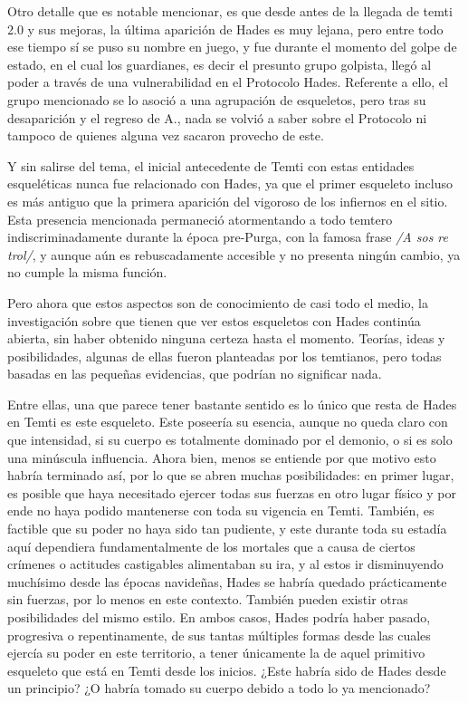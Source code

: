 \documentclass[
  spanish,
]{book}
\begin{document}
Otro detalle que es notable mencionar, es que desde antes de la llegada de temti 2.0 y sus mejoras, la última aparición de Hades es muy lejana, pero entre todo ese tiempo sí se puso su nombre en juego, y fue durante el momento del golpe de estado, en el cual los guardianes, es decir el presunto grupo golpista, llegó al poder a través de una vulnerabilidad en el Protocolo Hades. Referente a ello, el grupo mencionado se lo asoció a una agrupación de esqueletos, pero tras su desaparición y el regreso de A., nada se volvió a saber sobre el Protocolo ni tampoco de quienes alguna vez sacaron provecho de este.

Y sin salirse del tema, el inicial antecedente de Temti con estas entidades esqueléticas nunca fue relacionado con Hades, ya que el primer esqueleto incluso es más antiguo que la primera aparición del vigoroso de los infiernos en el sitio. Esta presencia mencionada permaneció atormentando a todo temtero indiscriminadamente durante la época pre-Purga, con la famosa frase \emph{/A sos re trol/}, y aunque aún es rebuscadamente accesible y no presenta ningún cambio, ya no cumple la misma función.

Pero ahora que estos aspectos son de conocimiento de casi todo el medio, la investigación sobre que tienen que ver estos esqueletos con Hades continúa abierta, sin haber obtenido ninguna certeza hasta el momento. Teorías, ideas y posibilidades, algunas de ellas fueron planteadas por los temtianos, pero todas basadas en las pequeñas evidencias, que podrían no significar nada.

Entre ellas, una que parece tener bastante sentido es lo único que resta de Hades en Temti es este esqueleto. Este poseería su esencia, aunque no queda claro con que intensidad, si su cuerpo es totalmente dominado por el demonio, o si es solo una minúscula influencia. Ahora bien, menos se entiende por que motivo esto habría terminado así, por lo que se abren muchas posibilidades: en primer lugar, es posible que haya necesitado ejercer todas sus fuerzas en otro lugar físico y por ende no haya podido mantenerse con toda su vigencia en Temti. También, es factible que su poder no haya sido tan pudiente, y este durante toda su estadía aquí dependiera fundamentalmente de los mortales que a causa de ciertos crímenes o actitudes castigables alimentaban su ira, y al estos ir disminuyendo muchísimo desde las épocas navideñas, Hades se habría quedado prácticamente sin fuerzas, por lo menos en este contexto. También pueden existir otras posibilidades del mismo estilo. En ambos casos, Hades podría haber pasado, progresiva o repentinamente, de sus tantas múltiples formas desde las cuales ejercía su poder en este territorio, a tener únicamente la de aquel primitivo esqueleto que está en Temti desde los inicios. ¿Este habría sido de Hades desde un principio? ¿O habría tomado su cuerpo debido a todo lo ya mencionado?
\end{document}
